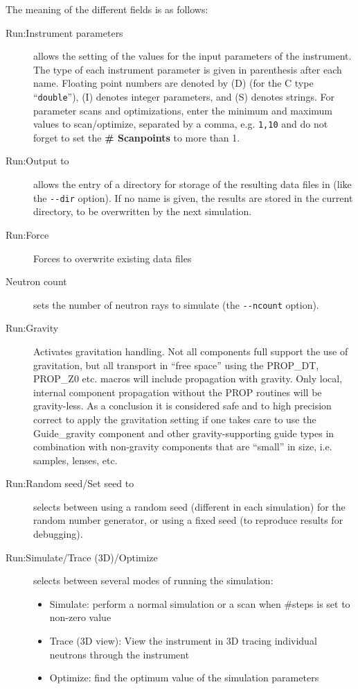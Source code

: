 The meaning of the different fields is as follows:
\begin{description}
\item[Run:Instrument parameters] allows the setting of the values for the input
  parameters of the instrument. The type of each instrument parameter is given
  in parenthesis after each name. Floating point numbers are denoted by (D) (for
  the C type ``\verb+double+''), (I) denotes integer parameters, and (S) denotes
  strings. For parameter scans and optimizations, enter the minimum and maximum
  values to scan/optimize, separated by a comma, e.g. \verb+1,10+ and do not
  forget to set the \textbf{\# Scanpoints} to more than 1.
\item[Run:Output to] allows the entry of a directory for storage of the
  resulting data files in (like the \verb+--dir+ option). If no name is given,
  the results are stored in the current directory, to be overwritten by the next
  simulation.
\item[Run:Force] Forces \MCS to overwrite existing data files
\item[Neutron count] sets the number of neutron rays to
  simulate (the \verb+--ncount+ option).
\item[Run:Gravity] Activates gravitation handling. Not all components full
  support the use of gravitation, but all transport in ``free space'' using the
  PROP\_DT, PROP\_Z0 etc. macros will include propagation with gravity. Only
  local, internal component propagation without the PROP routines will be
  gravity-less. As a conclusion it is considered safe and to high precision
  correct to apply the gravitation setting if one takes care to use the
  Guide\_gravity component and other gravity-supporting guide types in
  combination with non-gravity components that are ``small'' in size,
  i.e. samples, lenses, etc.
\item[Run:Random seed/Set seed to] selects between using a random seed (different
  in each simulation) for the random number generator, or using a fixed
  seed (to reproduce results for debugging).
\item[Run:Simulate/Trace (3D)/Optimize] selects between several modes of
  running the simulation:
  \begin{itemize}
  \item Simulate: perform a normal simulation or a scan when \#steps
    is set to non-zero value
  \item Trace (3D view): View the instrument in 3D tracing individual
    neutrons through the instrument
  \item Optimize: find the optimum value of the simulation parameters

\end{itemize}
\end{description}
